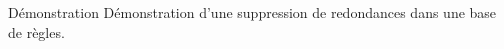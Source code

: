 \begin{frame}{Démonstration}
    Démonstration d'une suppression de redondances dans une base de règles.
\end{frame}